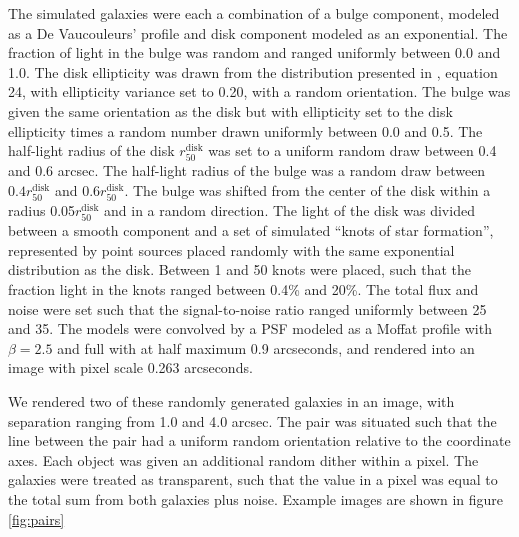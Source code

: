 \documentclass[fleqn,useAMS,usenatbib]{mnras}
\begin{document}
The simulated galaxies were each a combination of a bulge component, modeled as
a De Vaucouleurs' profile \citep{devauc1948} and disk component modeled as an
exponential. The fraction of light in the bulge was random and ranged uniformly
between 0.0 and 1.0. The disk ellipticity was drawn from the distribution
presented in \cite{ba14}, equation 24, with ellipticity variance set to 0.20,
with a random orientation. The bulge was given the same orientation as the disk
but with ellipticity set to the disk ellipticity times a random number drawn
uniformly between 0.0 and 0.5. The half-light radius of the disk
$r_{50}^{\mathrm{disk}}$ was set to a uniform random draw between 0.4 and 0.6
arcsec. The half-light radius of the bulge was a random draw between $0.4
r_{50}^{\mathrm{disk}}$ and $0.6 r_{50}^{\mathrm{disk}}$. The bulge was shifted
from the center of the disk within a radius 0.05$r_{50}^{\mathrm{disk}}$ and in
a random direction. The light of the disk was divided between a smooth
component and a set of simulated ``knots of star formation'', represented by
point sources placed randomly with the same exponential distribution as the
disk.  Between 1 and 50 knots were placed, such that the fraction light in the
knots ranged between 0.4\% and 20\%. The total flux and noise were set such
that the signal-to-noise ratio ranged uniformly between 25 and 35.  The models
were convolved by a PSF modeled as a Moffat profile with $\beta=2.5$ and full
with at half maximum 0.9 arcseconds, and rendered into an image with pixel
scale 0.263 arcseconds.

We rendered two of these randomly generated galaxies in an image, with
separation ranging from 1.0 and 4.0 arcsec. The pair was situated such that the
line between the pair had a uniform random orientation relative to the
coordinate axes. Each object was given an additional random dither within a
pixel. The galaxies were treated as transparent, such that the value in a pixel
was equal to the total sum from both galaxies plus noise. Example images are
shown in figure \ref{fig:pairs}
\end{document}
